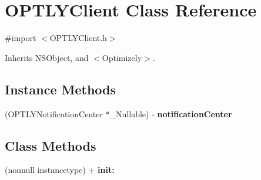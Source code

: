 \hypertarget{interface_o_p_t_l_y_client}{}\section{O\+P\+T\+L\+Y\+Client Class Reference}
\label{interface_o_p_t_l_y_client}


{\ttfamily \#import $<$O\+P\+T\+L\+Y\+Client.\+h$>$}



Inherits N\+S\+Object, and $<$\+Optimizely$>$.

\subsection*{Instance Methods}
\begin{DoxyCompactItemize}
\item 
\mbox{\label{interface_o_p_t_l_y_client_a2e6586f90fd94075dff6adc06c262a59}} 
(O\+P\+T\+L\+Y\+Notification\+Center $\ast$\+\_\+\+Nullable) -\/ {\bfseries notification\+Center}
\end{DoxyCompactItemize}
\subsection*{Class Methods}
\begin{DoxyCompactItemize}
\item 
\mbox{\label{interface_o_p_t_l_y_client_ae1ae4786bfacd5f0489436a5437175d5}} 
(nonnull instancetype) + {\bfseries init\+:}
\end{DoxyCompactItemize}
